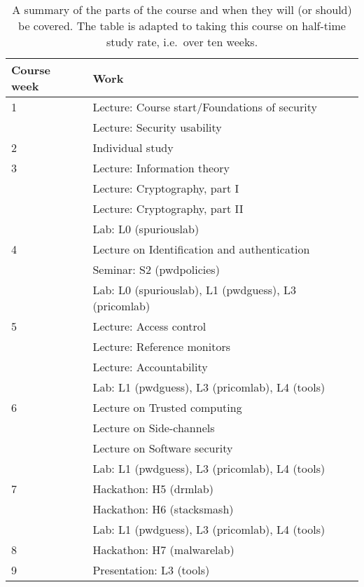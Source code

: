 \begin{table}
	\centering
  \caption{%
    A summary of the parts of the course and when they will (or should) be 
    covered.
    The table is adapted to taking this course on half-time study rate, i.e.\ 
    over ten weeks.
  }\label{TimeTable}
  \begin{tabular}{lp{9cm}}
    \toprule
    \textbf{Course week}	& \textbf{Work} \\
    \midrule
    1
    & Lecture: Course start/Foundations of security\\
    & Lecture: Security usability\\
    \midrule
    2
    & Individual study\\
    \midrule
    3
    & Lecture: Information theory\\
    & Lecture: Cryptography, part I\\
    & Lecture: Cryptography, part II\\
    & Lab: L0 (spuriouslab)\\
    \midrule
    4
    & Lecture on Identification and authentication\\
    & Seminar: S2 (pwdpolicies)\\
    & Lab: L0 (spuriouslab), L1 (pwdguess), L3 (pricomlab)\\
    \midrule
    5
    & Lecture: Access control\\
    & Lecture: Reference monitors\\
    & Lecture: Accountability\\
    & Lab: L1 (pwdguess), L3 (pricomlab), L4 (tools)\\
    \midrule
    6
    & Lecture on Trusted computing\\
    & Lecture on Side-channels\\
    & Lecture on Software security\\
    & Lab: L1 (pwdguess), L3 (pricomlab), L4 (tools)\\
    \midrule
    7
    & Hackathon: H5 (drmlab)\\
    & Hackathon: H6 (stacksmash)\\
    & Lab: L1 (pwdguess), L3 (pricomlab), L4 (tools)\\
    \midrule
    8
    & Hackathon: H7 (malwarelab)\\
    \midrule
    9
    & Presentation: L3 (tools)\\

\end{tabular}
\end{table}
